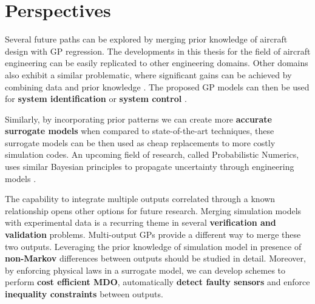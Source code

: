 \section{Perspectives}
Several future paths can be explored by merging prior knowledge of aircraft design with GP regression. The developments in this thesis for the field of aircraft engineering can be easily replicated to other engineering domains. Other domains also exhibit a similar problematic, where significant gains can be achieved by combining data and prior knowledge \cite{lookman2017statistical, jidling2017linearly, journals/jmlr/AlvarezLL09}. The proposed GP models can then be used for \textbf{system identification} or \textbf{system control} \cite{kocijan2016modelling, frigola2014variational, deisenroth2011pilco}. 


Similarly, by incorporating prior patterns we can create more \textbf{accurate surrogate models} when compared to state-of-the-art techniques, these surrogate models can be then used as cheap replacements to more costly simulation codes. An upcoming field of research, called Probabilistic Numerics, uses similar Bayesian principles to propagate uncertainty through engineering models \cite{2014arXiv14022058H}. 

The capability to integrate multiple outputs correlated through a known relationship opens other options for future research. Merging simulation models with experimental data is a recurring theme in several \textbf{verification and validation} problems. Multi-output GPs provide a different way to merge these two outputs. Leveraging the prior knowledge of simulation model in presence of \textbf{non-Markov} differences between outputs should be studied in detail. Moreover, by enforcing physical laws in a surrogate model, we can develop schemes to perform \textbf{cost efficient MDO}, automatically \textbf{detect faulty sensors} and enforce \textbf{inequality constraints} between outputs. 

